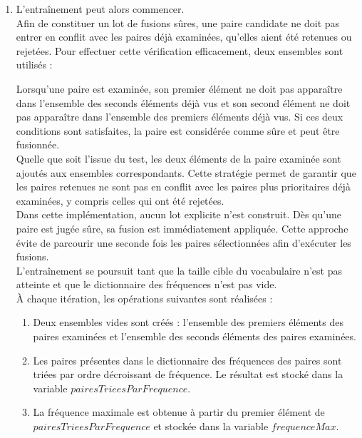\documentclass[12pt,a4paper]{report}
\begin{document}
\begin{enumerate}
		\item L'entraînement peut alors commencer.\\
		Afin de constituer un lot de fusions sûres, une paire candidate ne doit pas entrer en conflit avec les paires déjà examinées, qu'elles aient été retenues ou rejetées. Pour effectuer cette vérification efficacement, deux ensembles sont utilisés :
		Lorsqu'une paire est examinée, son premier élément ne doit pas apparaître dans l'ensemble des seconds éléments déjà vus et son second élément ne doit pas apparaître dans l'ensemble des premiers éléments déjà vus. Si ces deux conditions sont satisfaites, la paire est considérée comme sûre et peut être fusionnée.\\
		Quelle que soit l'issue du test, les deux éléments de la paire examinée sont ajoutés aux ensembles correspondants. Cette stratégie permet de garantir que les paires retenues ne sont pas en conflit avec les paires plus prioritaires déjà examinées, y compris celles qui ont été rejetées.\\
		Dans cette implémentation, aucun lot explicite n'est construit. Dès qu'une paire est jugée sûre, sa fusion est immédiatement appliquée. Cette approche évite de parcourir une seconde fois les paires sélectionnées afin d'exécuter les fusions.\\
		L'entraînement se poursuit tant que la taille cible du vocabulaire n'est pas atteinte et que le dictionnaire des fréquences n'est pas vide.\\
		À chaque itération, les opérations suivantes sont réalisées :
		\begin{enumerate}
			\item Deux ensembles vides sont créés : l'ensemble des premiers éléments des paires examinées et l'ensemble des seconds éléments des paires examinées.
			\item Les paires présentes dans le dictionnaire des fréquences des paires sont triées par ordre décroissant de fréquence. Le résultat est stocké dans la variable $pairesTrieesParFrequence$.
			\item La fréquence maximale est obtenue à partir du premier élément de $pairesTrieesParFrequence$ et stockée dans la variable $frequenceMax$.

\end{enumerate}
\end{enumerate}
\end{document}
